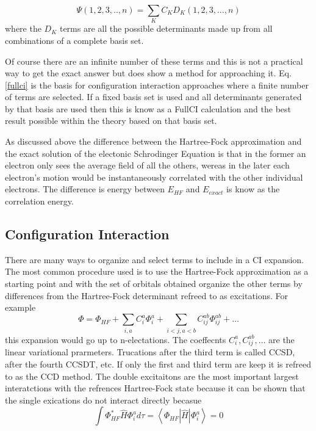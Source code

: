  
  
\begin{equation}
\Psi(1,2,3,..,n)=\sum_K{C_{K}D_{K}(1,2,3,...,n)}
\label{fullci}
\end{equation}
where the $D_K$ terms are all the possible determinants made up from all combinations of a complete basis set.

Of course there are an infinite number of these terms and this is not a practical way to get the exact answer but does show a method for approaching it.  Eq. \ref{fullci} is the basis for configuration interaction approaches where a finite number of terms are selected.  If a fixed basis set is used and all determinants generated by that basis are used then this is know as a FullCI calculation and the best result possible within the theory based on that basis set.

 As discussed above the difference between the Hartree-Fock approximation and the exact solution of the electonic Schrodinger Equation is that in the former an electron only sees the average field of all the others, wereas in the later each electron's motion would be instantaneously correlated with the other individual electrons.  The difference is energy between $E_{HF}$ and $E_{exact}$ is know as the correlation energy.

\subsection{Configuration Interaction}
There are many ways to organize and select terms to include in a CI expansion.  The most common procedure used is to use the Hartree-Fock approximation as a starting point and with the set of orbitals obtained organize the other terms by differences from the Hartree-Fock determinant refreed to as excitations.  For example
\begin{equation}
\Phi = \Phi_{HF} + \sum_{i,a}C_i^a\Phi_i^a + \sum_{i<j,a<b}C_{ij}^{ab}\Phi_{ij}^{ab} + \ldots
\end{equation}
this expansion would go up to n-electations.  The coeffecnts $C_i^a, C_{ij}^{ab}, \ldots$ are the linear variational prarmeters.  Trucations after the third term is called CCSD, after the fourth CCSDT, etc.  If only the first and third term are keep it is refreed to as the CCD method.  The double excitaitons are the most important largest interatctions with the refrences Hartree-Fock state because it can be shown that the single exications do not interact directly becasue
\begin{equation}
\int\Phi_{HF}^*\widehat{H}\Phi_i^ad\tau = \left\langle\Phi_{HF}\left|\widehat{H}\right|\Phi_i^a\right\rangle = 0
\end{equation}

